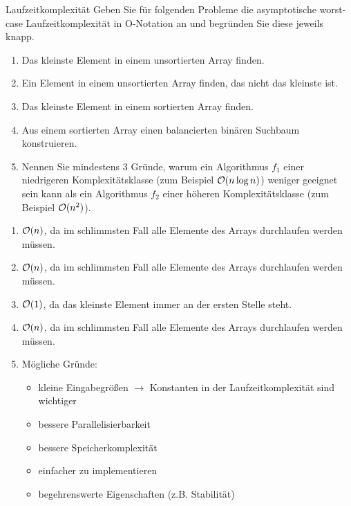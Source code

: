 \documentclass{article}
\begin{document}
\begin{exercise}{Laufzeitkomplexität}
  Geben Sie für folgenden Probleme die asymptotische worst-case Laufzeitkomplexität in O-Notation an und begründen Sie diese jeweils knapp.
  \begin{enumerate}
    \item Das kleinste Element in einem unsortierten Array finden.
    \item Ein Element in einem unsortierten Array finden, das nicht das kleinste ist.
    \item Das kleinste Element in einem sortierten Array finden.
    \item Aus einem sortierten Array einen balancierten binären Suchbaum konstruieren.
    \item Nennen Sie mindestens 3 Gründe, warum ein Algorithmus $f_1$ einer niedrigeren Komplexitätsklasse (zum Beispiel $\mathcal{O}(n \log n)$) weniger geeignet sein kann als ein Algorithmus $f_2$ einer höheren Komplexitätsklasse (zum Beispiel $\mathcal{O}(n^2)$).
  \end{enumerate}

  \begin{solution}
    \begin{enumerate}
      \item $\mathcal{O}(n)$, da im schlimmsten Fall alle Elemente des Arrays durchlaufen werden müssen.
      \item $\mathcal{O}(n)$, da im schlimmsten Fall alle Elemente des Arrays durchlaufen werden müssen.
      \item $\mathcal{O}(1)$, da das kleinste Element immer an der ersten Stelle steht.
      \item $\mathcal{O}(n)$, da im schlimmsten Fall alle Elemente des Arrays durchlaufen werden müssen.
      \item Mögliche Gründe:
            \begin{itemize}
              \item kleine Eingabegrößen $\to$ Konstanten in der Laufzeitkomplexität sind wichtiger
              \item bessere Parallelisierbarkeit
              \item bessere Speicherkomplexität
              \item einfacher zu implementieren
              \item begehrenswerte Eigenschaften (z.B. Stabilität)
            \end{itemize}
    \end{enumerate}
  \end{solution}
\end{exercise}
\end{document}
